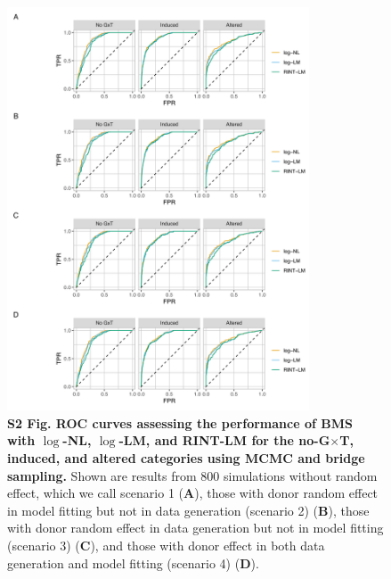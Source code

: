 \documentclass[11pt]{article}
\newcommand{\GxT}{G$\times$T\xspace}
\begin{document}
\begin{figure}[!ht]
\begin{center}
  \includegraphics[width=0.8\textwidth]{png/sim_rocc_mcmc_bs.png}
\end{center}
\caption{
  {\bf
    S2 Fig.
    ROC curves assessing the performance of BMS with $\log$-NL, $\log$-LM, and RINT-LM for the no-\GxT, induced, and altered categories using MCMC and bridge sampling.}
Shown are results from 800 simulations without random effect, which we call scenario 1 (\textbf{A}), those with donor random effect in model fitting but not in data generation (scenario 2) (\textbf{B}), those with donor random effect in data generation but not in model fitting (scenario 3) (\textbf{C}), and those with donor effect in both data generation and model fitting (scenario 4) (\textbf{D}).
}
\label{s-fig:sim-rocc-mcmc}
\end{figure}
\end{document}
